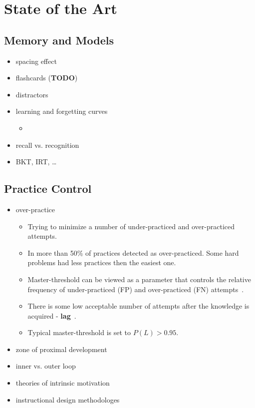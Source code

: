 \documentclass[table,color]{fithesis3/fithesis3}
\begin{document}
\chapter{State of the Art}

\section{Memory and Models}

\begin{itemize}
	\item spacing effect~\cite{ostrow2015blocking,maass2015how,kornell2008learning,kornell2010spacing}
	\item flashcards (\textbf{TODO})~\cite{kornell2014focusing,bjork2013self,kornell2008optimising,kornell2009optimising}
	\item distractors~\cite{little2015optimizing}
	\item learning and forgetting curves~\cite{streeter2015mixture}
		\begin{itemize}
			\item ~
		\end{itemize}
	\item recall vs. recognition
	\item BKT, IRT, \ldots
\end{itemize}

\section{Practice Control}

\begin{itemize}
	\item over-practice
		\begin{itemize}
			\item Trying to minimize a number of under-practiced and over-practiced attempts.
			\item In \cite{cen2007over} more than 50\% of practices detected as
				over-practiced. Some hard problems had less practices then the easiest
				one.
			\item Master-threshold can be viewed as a parameter that controls the
				relative frequency of under-practiced (FP) and over-practiced (FN)
				attempts~\cite{fancsali2013optimal}.
			\item There is some low acceptable number of attempts after the knowledge
				is acquired - \textbf{lag}~\cite{fancsali2013optimal}.
			\item Typical master-threshold is set to $P(L) > 0.95$.
		\end{itemize}
	\item zone of proximal development~\cite{lee2005signifying}
	\item inner vs. outer loop~\cite{koedinger2013new}
	\item theories of intrinsic motivation~\cite{habgood2011motivating}
	\item instructional design methodologes~\cite{luckin2001designing}
\end{itemize}
\end{document}

